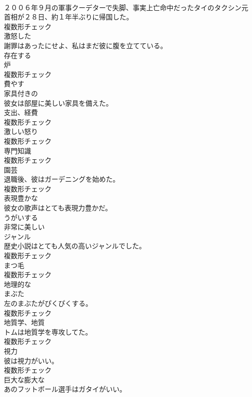 \documentclass[8pt]{extreport}
\begin{document}
\begin{CJK}{UTF8}{min}
\\	２００６年９月の軍事クーデターで失脚、事実上亡命中だったタイのタクシン元首相が２８日、約１年半ぶりに帰国した。	
\\	複数形チェック
\\	[形容詞]	激怒した	
\\	謝罪はあったにせよ、私はまだ彼に腹を立てている。	
\\	[形容詞]	存在する	
\\	[名詞]	炉	
\\	複数形チェック
\\	[動詞]	費やす	
\\	[形容詞]	家具付きの	
\\	彼女は部屋に美しい家具を備えた。	
\\	[名詞]	支出、経費	
\\	複数形チェック
\\	[名詞]	激しい怒り	
\\	複数形チェック
\\	[名詞]	専門知識	
\\	複数形チェック
\\	[名詞]	園芸	
\\	退職後、彼はガーデニングを始めた。	
\\	複数形チェック
\\	[形容詞]	表現豊かな	
\\	彼女の歌声はとても表現力豊かだ。	
\\	[動詞]	うがいする	
\\	[形容詞]	非常に美しい	
\\	[名詞]	ジャンル	
\\	歴史小説はとても人気の高いジャンルでした。	
\\	複数形チェック
\\	[名詞]	まつ毛	
\\	複数形チェック
\\	[形容詞]	地理的な	
\\	[名詞]	まぶた	
\\	左のまぶたがぴくぴくする。	
\\	複数形チェック
\\	[名詞]	地質学、地質	
\\	トムは地質学を専攻してた。	
\\	複数形チェック
\\	[名詞]	視力	
\\	彼は視力がいい。	
\\	複数形チェック
\\	[形容詞]	巨大な膨大な	
\\	あのフットボール選手はガタイがいい。	

\end{CJK}
\end{document}
